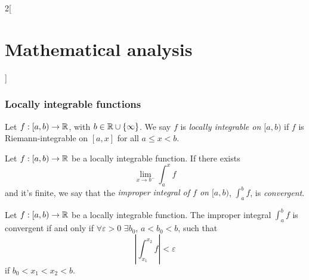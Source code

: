 \documentclass[../../../main.tex]{subfiles}
\begin{document}
\begin{multicols}{2}[\section{Mathematical analysis}]
  \subsubsection{Locally integrable functions}
  \begin{definition}
    Let $f:[a,b)\rightarrow\mathbb{R} $, with $b\in\mathbb{R} \cup\{\infty\}$. We say $f$ is \textit{locally integrable on $[a,b)$} if $f$ is Riemann-integrable on $[a,x]$ for all $a\leq x<b$.
  \end{definition}
  \begin{definition}
    Let $f:[a,b)\rightarrow\mathbb{R} $ be a locally integrable function. If there exists $$\lim_{x\to b^-}\int_a^x f$$ and it's finite, we say that the \textit{improper integral of $f$ on $[a,b)$}, $\displaystyle\int_a^b f$, is \textit{convergent}.
  \end{definition}
  \begin{theorem}
    Let $f:[a,b)\rightarrow\mathbb{R} $ be a locally integrable function. The improper integral $\displaystyle\int_a^b f$ is convergent if and only if $\forall\varepsilon>0$ $\exists b_0$, $a<b_0<b$, such that $$\left|\int_{x_1}^{x_2} f\right|<\varepsilon$$ if $b_0<x_1<x_2<b$.
  \end{theorem}

\end{multicols}
\end{document}
